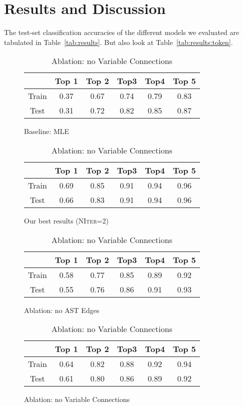 \section{Results and Discussion}
\label{sec:results}


The test-set classification accuracies of the different models we evaluated are tabulated in Table~\ref{tab:results}. But also look at Table~\ref{tab:results:token}.


\begin{table}
  \centering
  \begin{subfigure}{\linewidth}
    \centering
    \begin{tabular}{c|ccccc}
      & Top 1 & Top 2 & Top3 & Top4 & Top 5 \\
      \hline
      Train & 0.37 & 0.67 & 0.74 & 0.79 & 0.83 \\
      Test & 0.31 & 0.72 & 0.82 & 0.85 & 0.87
    \end{tabular}
    \caption{Baseline: MLE}\label{tab:results:mle}
  \end{subfigure}

  \begin{subfigure}{\linewidth}
    \centering
    \begin{tabular}{c|ccccc}
      & Top 1 & Top 2 & Top3 & Top4 & Top 5 \\
      \hline
      Train & 0.69 & 0.85 & 0.91 & 0.94 & 0.96 \\
      Test & 0.66 & 0.83 & 0.91 & 0.94 & 0.96
    \end{tabular}
    \caption{Our best results (\textsc{NIter}=2)}\label{tab:results:pure}
  \end{subfigure}

  \begin{subfigure}{\linewidth}
    \centering
    \begin{tabular}{c|ccccc}
      & Top 1 & Top 2 & Top3 & Top4 & Top 5 \\
      \hline
      Train & 0.58 & 0.77 & 0.85 & 0.89 & 0.92 \\
      Test & 0.55 & 0.76 & 0.86 & 0.91 & 0.93
    \end{tabular}
    \caption{Ablation: no AST Edges}\label{tab:results:ast}
  \end{subfigure}


  \begin{subfigure}{\linewidth}
    \centering
    \begin{tabular}{c|ccccc}
      & Top 1 & Top 2 & Top3 & Top4 & Top 5 \\
      \hline
      Train & 0.64 & 0.82 & 0.88 & 0.92 & 0.94 \\
      Test & 0.61 & 0.80 & 0.86 & 0.89 & 0.92
    \end{tabular}
    \caption{Ablation: no Variable Connections}\label{tab:results:variable}
  \end{subfigure}


\end{table}
